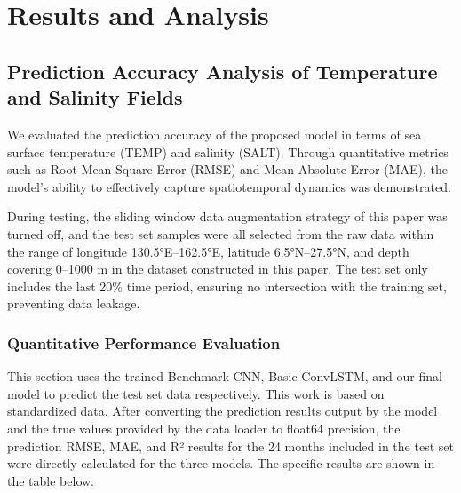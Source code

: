 \documentclass[webpdf,contemporary,large]{oup-authoring-template}
\begin{document}
\section{Results and Analysis}

\subsection{Prediction Accuracy Analysis of Temperature and Salinity Fields}

We evaluated the prediction accuracy of the proposed model in terms of sea surface temperature (TEMP) and salinity (SALT). Through quantitative metrics such as Root Mean Square Error (RMSE) and Mean Absolute Error (MAE), the model's ability to effectively capture spatiotemporal dynamics was demonstrated.

During testing, the sliding window data augmentation strategy of this paper was turned off, and the test set samples were all selected from the raw data within the range of longitude 130.5°E–162.5°E, latitude 6.5°N–27.5°N, and depth covering 0–1000 m in the dataset constructed in this paper. The test set only includes the last 20\% time period, ensuring no intersection with the training set, preventing data leakage.

\subsubsection{Quantitative Performance Evaluation}

This section uses the trained Benchmark CNN, Basic ConvLSTM, and our final model to predict the test set data respectively. This work is based on standardized data. After converting the prediction results output by the model and the true values provided by the data loader to float64 precision, the prediction RMSE, MAE, and R² results for the 24 months included in the test set were directly calculated for the three models. The specific results are shown in the table below.

\begin{table}[H]
\caption{Comparison of Prediction Results of Different Models}
\centering
{}
\end{table}
\end{document}
